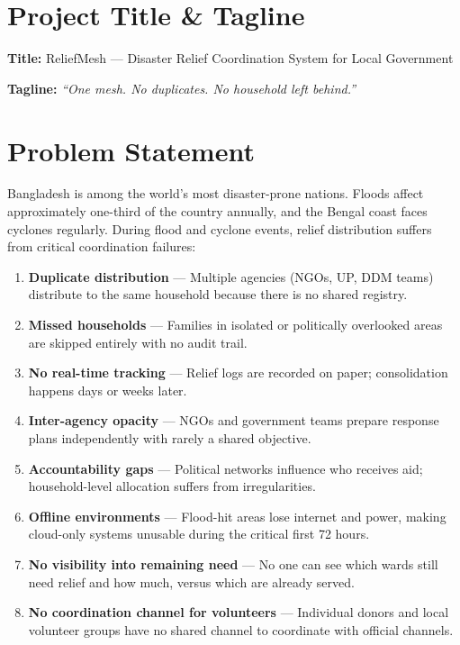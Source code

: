 
\section{Project Title \& Tagline}
\textbf{Title:} ReliefMesh --- Disaster Relief Coordination System for Local Government

\textbf{Tagline:} \textit{``One mesh. No duplicates. No household left behind.''}

\section{Problem Statement}
Bangladesh is among the world's most disaster-prone nations. Floods affect approximately one-third of the country annually, and the Bengal coast faces cyclones regularly. During flood and cyclone events, relief distribution suffers from critical coordination failures:

\begin{enumerate}[label=\#\arabic*, nosep]
    \item \textbf{Duplicate distribution} --- Multiple agencies (NGOs, UP, DDM teams) distribute to the same household because there is no shared registry.
    \item \textbf{Missed households} --- Families in isolated or politically overlooked areas are skipped entirely with no audit trail.
    \item \textbf{No real-time tracking} --- Relief logs are recorded on paper; consolidation happens days or weeks later.
    \item \textbf{Inter-agency opacity} --- NGOs and government teams prepare response plans independently with rarely a shared objective.
    \item \textbf{Accountability gaps} --- Political networks influence who receives aid; household-level allocation suffers from irregularities.
    \item \textbf{Offline environments} --- Flood-hit areas lose internet and power, making cloud-only systems unusable during the critical first 72 hours.
    \item \textbf{No visibility into remaining need} --- No one can see which wards still need relief and how much, versus which are already served.
    \item \textbf{No coordination channel for volunteers} --- Individual donors and local volunteer groups have no shared channel to coordinate with official channels.
\end{enumerate}

